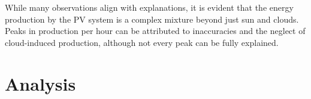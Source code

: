 \documentclass{article}
\begin{document}
While many observations align with explanations, it is evident that the energy production by the PV system is a complex mixture beyond just sun and clouds. Peaks in production per hour can be attributed to inaccuracies and the neglect of cloud-induced production, although not every peak can be fully explained.


% 


\section{Analysis}

\end{document}
